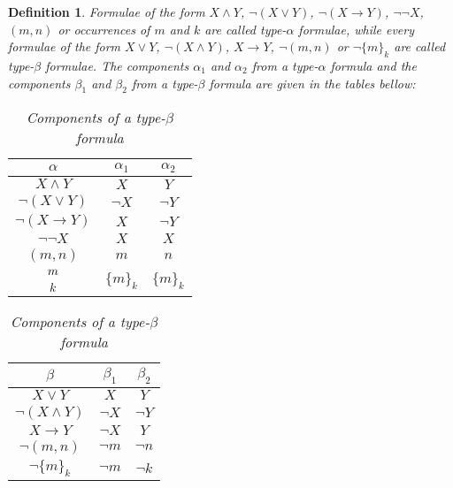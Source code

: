 \documentclass[submission,copyright,creativecommons]{eptcs}
\newtheorem{definition}{Definition}[section]
\begin{document}
        \begin{definition}
            Formulae of the form $X \land Y$, $\neg (X \lor Y)$, $\neg (X \to Y)$, $\neg \neg X$, $(m, n)$ or occurrences of $m$ and $k$ are called type-$\alpha$ formulae, while every formulae of the form $X \lor Y$, $\neg (X \land Y)$, $X \to Y$, $\neg (m, n)$ or $\neg \{m\}_k$ are called type-$\beta$ formulae. The components $\alpha_1$ and $\alpha_2$ from a type-$\alpha$ formula and the components $\beta_1$ and $\beta_2$ from a type-$\beta$ formula are given in the tables bellow:
            
            \begin{table}[H]
            \parbox{.45\linewidth}{
                \centering
                \begin{tabular}{c|c|c}
                    $\alpha$ & $\alpha_1$ & $\alpha_2$ \\
                    \hline
                    $X \land Y$ & $X$ & $Y$ \\
                    $\neg (X \lor Y)$ & $\neg X$ & $\neg Y$ \\
                    $\neg (X \to Y)$ & $X$ & $\neg Y$ \\
                    $\neg \neg X$ & $X$ & $X$ \\
                    $(m,n)$ & $m$ & $n$ \\
                    $\genfrac{}{}{0pt}{}{}{\genfrac{}{}{0pt}{0}{m}{k}}$ & $\{m\}_k$ & $\{m\}_k$ \\
                \end{tabular}
                \caption{Components of a type-$\alpha$ formula}
                \label{tableauxS5dyComponentsAlpha} }
           \hfill
            \parbox{.45\linewidth}{
                \centering
                \begin{tabular}{c|c|c}
                    $\beta$ & $\beta_1$ & $\beta_2$ \\
                    \hline
                    $X \lor Y$ & $X$ & $Y$ \\
                    $\neg (X \land Y)$ & $\neg X$ & $\neg Y$ \\
                    $X \to Y$ & $\neg X$ & $Y$ \\
                    $\neg (m,n)$ & $\neg m$ & $\neg n$ \\
                    $\neg \{m\}_k$ & $\neg m$ & $\neg k$ \\
                \end{tabular}
                \caption{Components of a type-$\beta$ formula}
                \label{tableauxS5dyComponentsBeta} }
            \end{table}
        \end{definition}
        
\end{document}
